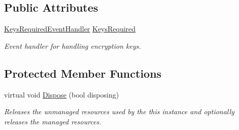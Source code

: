 \subsection*{Public Attributes}
\begin{DoxyCompactItemize}
\item 
\hyperlink{class_i_c_sharp_code_1_1_sharp_zip_lib_1_1_zip_1_1_zip_file_ab2c704e700f9b0c079f12a4c5ea775f4}{Keys\+Required\+Event\+Handler} \hyperlink{class_i_c_sharp_code_1_1_sharp_zip_lib_1_1_zip_1_1_zip_file_aeee7edb132927a247cb25ccfc8c78531}{Keys\+Required}
\begin{DoxyCompactList}\small\item\em Event handler for handling encryption keys. \end{DoxyCompactList}\end{DoxyCompactItemize}
\subsection*{Protected Member Functions}
\begin{DoxyCompactItemize}
\item 
virtual void \hyperlink{class_i_c_sharp_code_1_1_sharp_zip_lib_1_1_zip_1_1_zip_file_ade3c101c35ede840e860759d43381c62}{Dispose} (bool disposing)
\begin{DoxyCompactList}\small\item\em Releases the unmanaged resources used by the this instance and optionally releases the managed resources. \end{DoxyCompactList}\end{DoxyCompactItemize}
